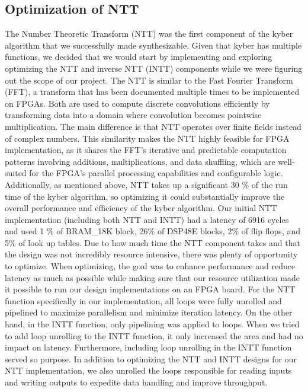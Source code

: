 
\subsection*{Optimization of NTT}

  The Number Theoretic Transform (NTT) was the first component of the kyber algorithm that we successfully made synthesizable. Given that kyber has multiple functions, we decided that we would start by implementing and exploring optimizing the NTT and inverse NTT (INTT) components while we were figuring out the scope of our project. The NTT is similar to the Fast Fourier Transform (FFT), a transform that has been documented multiple times to be implemented on FPGAs. Both are used to compute discrete convolutions efficiently by transforming data into a domain where convolution becomes pointwise multiplication. The main difference is that NTT operates over finite fields instead of complex numbers. This similarity makes the NTT highly feasible for FPGA implementation, as it shares the FFT's iterative and predictable computation patterns involving additions, multiplications, and data shuffling, which are well-suited for the FPGA’s parallel processing capabilities and configurable logic. Additionally, as mentioned above, NTT takes up a significant 30 \% of the run time of the kyber algorithm, so optimizing it could substantially improve the overall performance and efficiency of the kyber algorithm.  
  Our initial NTT implementation (including both NTT and INTT) had a latency of 6916 cycles and used 1 \% of BRAM\_18K block, 26\% of DSP48E blocks, 2\% of  flip flops, and 5\% of look up tables. Due to how much time the NTT component takes and that the design was not incredibly resource intensive, there was plenty of opportunity to optimize. When optimizing, the goal was to enhance performance and reduce latency as much as possible while making sure that our resource utilization made it possible to run our design implementations on an FPGA board. For the NTT function specifically in our implementation, all loops were fully unrolled and pipelined to maximize parallelism and minimize iteration latency. On the other hand, in the INTT function, only pipelining was applied to loops. When we tried to add loop unrolling to the INTT function, it only increased the area and had no impact on latency. Furthermore, including loop unrolling in the INTT function served so purpose. In addition to optimizing the NTT and INTT designs for our NTT implementation, we also unrolled the loops responsible for reading inputs and writing outputs to expedite data handling and improve throughput. 
